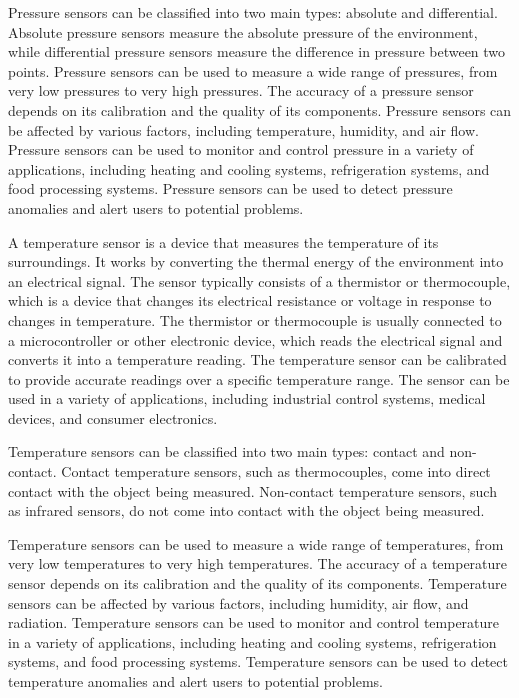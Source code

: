 Pressure sensors can be classified into two main types: absolute and differential. Absolute pressure sensors measure the absolute pressure of the environment, while differential pressure sensors measure the difference in pressure between two points. Pressure sensors can be used to measure a wide range of pressures, from very low pressures to very high pressures. The accuracy of a pressure sensor depends on its calibration and the quality of its components. Pressure sensors can be affected by various factors, including temperature, humidity, and air flow. Pressure sensors can be used to monitor and control pressure in a variety of applications, including heating and cooling systems, refrigeration systems, and food processing systems. Pressure sensors can be used to detect pressure anomalies and alert users to potential problems. \cite{Gan:2024}

\bigskip

A temperature sensor is a device that measures the temperature of its surroundings. It works by converting the thermal energy of the environment into an electrical signal. The sensor typically consists of a thermistor or thermocouple, which is a device that changes its electrical resistance or voltage in response to changes in temperature. The thermistor or thermocouple is usually connected to a microcontroller or other electronic device, which reads the electrical signal and converts it into a temperature reading. The temperature sensor can be calibrated to provide accurate readings over a specific temperature range. The sensor can be used in a variety of applications, including industrial control systems, medical devices, and consumer electronics.

Temperature sensors can be classified into two main types: contact and non-contact. Contact temperature sensors, such as thermocouples, come into direct contact with the object being measured. Non-contact temperature sensors, such as infrared sensors, do not come into contact with the object being measured.

Temperature sensors can be used to measure a wide range of temperatures, from very low temperatures to very high temperatures. The accuracy of a temperature sensor depends on its calibration and the quality of its components. Temperature sensors can be affected by various factors, including humidity, air flow, and radiation. Temperature sensors can be used to monitor and control temperature in a variety of applications, including heating and cooling systems, refrigeration systems, and food processing systems. Temperature sensors can be used to detect temperature anomalies and alert users to potential problems.



